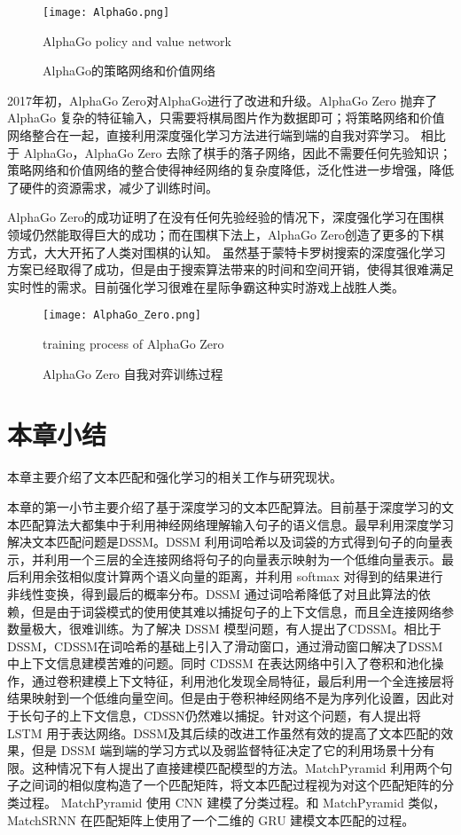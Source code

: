 \begin{figure}[!htbp]\centering
  \texttt{[image: AlphaGo.png]}
  \caption{AlphaGo的策略网络和价值网络} {AlphaGo policy and value network}
  \label{fig:AlphaGo}       %
\end{figure}

2017年初，AlphaGo Zero\cite{Silver2017MasteringTG}对AlphaGo进行了改进和升级。AlphaGo Zero 抛弃了 AlphaGo 复杂的特征输入，只需要将棋局图片作为数据即可；将策略网络和价值网络整合在一起，直接利用深度强化学习方法进行端到端的自我对弈学习。
相比于 AlphaGo，AlphaGo Zero 去除了棋手的落子网络，因此不需要任何先验知识；策略网络和价值网络的整合使得神经网络的复杂度降低，泛化性进一步增强，降低了硬件的资源需求，减少了训练时间。

AlphaGo Zero的成功证明了在没有任何先验经验的情况下，深度强化学习在围棋领域仍然能取得巨大的成功；而在围棋下法上，AlphaGo Zero创造了更多的下棋方式，大大开拓了人类对围棋的认知。
虽然基于蒙特卡罗树搜索的深度强化学习方案已经取得了成功，但是由于搜索算法带来的时间和空间开销，使得其很难满足实时性的需求。目前强化学习很难在星际争霸这种实时游戏上战胜人类。

\begin{figure}[!htbp]\centering
  \texttt{[image: AlphaGo\_Zero.png]}
  \caption{AlphaGo Zero 自我对弈训练过程} {training process of AlphaGo Zero}
  \label{fig:AlphaGo_Zero}       %
\end{figure}

\section{本章小结}

本章主要介绍了文本匹配和强化学习的相关工作与研究现状。

本章的第一小节主要介绍了基于深度学习的文本匹配算法。目前基于深度学习的文本匹配算法大都集中于利用神经网络理解输入句子的语义信息。最早利用深度学习解决文本匹配问题是DSSM。DSSM 利用词哈希以及词袋的方式得到句子的向量表示，并利用一个三层的全连接网络将句子的向量表示映射为一个低维向量表示。最后利用余弦相似度计算两个语义向量的距离，并利用 softmax 对得到的结果进行非线性变换，得到最后的概率分布。DSSM 通过词哈希降低了对且此算法的依赖，但是由于词袋模式的使用使其难以捕捉句子的上下文信息，而且全连接网络参数量极大，很难训练。为了解决 DSSM 模型问题，有人提出了CDSSM。相比于DSSM，CDSSM在词哈希的基础上引入了滑动窗口，通过滑动窗口解决了DSSM中上下文信息建模苦难的问题。同时 CDSSM 在表达网络中引入了卷积和池化操作，通过卷积建模上下文特征，利用池化发现全局特征，最后利用一个全连接层将结果映射到一个低维向量空间。但是由于卷积神经网络不是为序列化设置，因此对于长句子的上下文信息，CDSSN仍然难以捕捉。针对这个问题，有人提出将 LSTM 用于表达网络。DSSM及其后续的改进工作虽然有效的提高了文本匹配的效果，但是 DSSM 端到端的学习方式以及弱监督特征决定了它的利用场景十分有限。这种情况下有人提出了直接建模匹配模型的方法。MatchPyramid 利用两个句子之间词的相似度构造了一个匹配矩阵，将文本匹配过程视为对这个匹配矩阵的分类过程。 MatchPyramid 使用 CNN 建模了分类过程。和 MatchPyramid 类似， MatchSRNN 在匹配矩阵上使用了一个二维的 GRU 建模文本匹配的过程。

